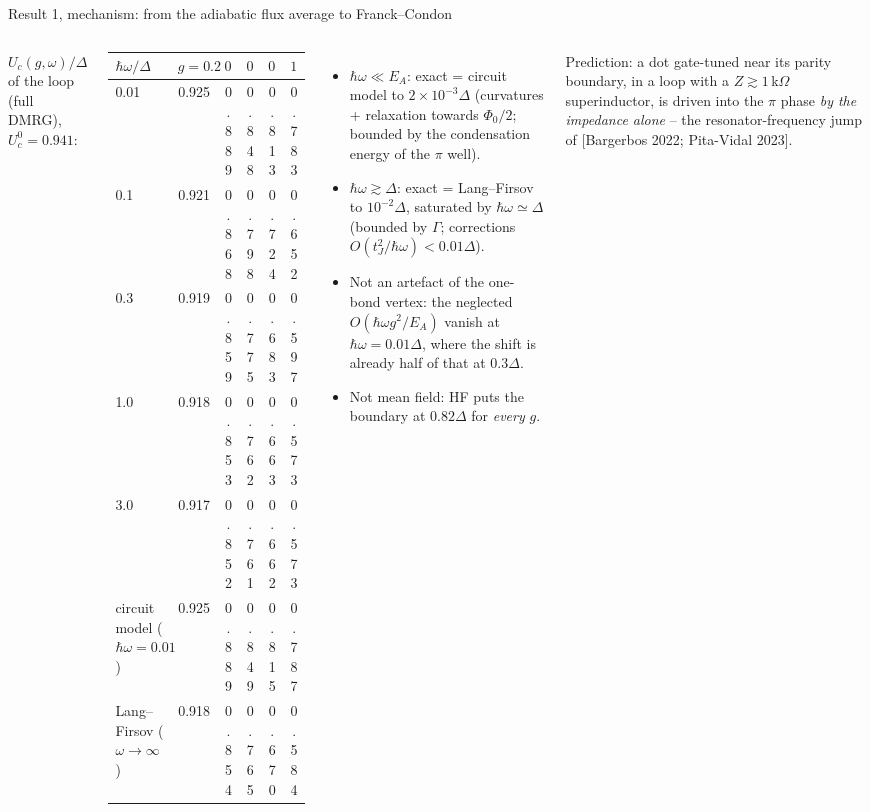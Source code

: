 \documentclass[aspectratio=169,9pt]{beamer}
\newcommand{\hw}{\hbar\omega}
\renewcommand{\cite}[1]{{\scriptsize\textcolor{ink!60}{[#1]}}}
\begin{document}
\begin{frame}{Result 1, mechanism: from the adiabatic flux average to Franck--Condon}
  \begin{columns}[T]
    \centering\small $U_c(g,\omega)/\Delta$ of the loop (full DMRG), $U_c^0=0.941$:\\[1mm]
    \scriptsize
    \begin{tabular}{@{}lccccc@{}}
      \toprule
      $\hw/\Delta$ & $g=0.2$ & $0.4$ & $0.6$ & $0.8$ & $1.0$\\ \midrule
      0.01 & 0.925 & 0.889 & 0.848 & 0.813 & 0.783\\
      0.1 & 0.921 & 0.868 & 0.798 & 0.724 & 0.652\\
      0.3 & 0.919 & 0.859 & 0.775 & 0.683 & 0.597\\
      1.0 & 0.918 & 0.853 & 0.762 & 0.663 & 0.573\\
      3.0 & 0.917 & 0.852 & 0.761 & 0.662 & 0.573\\ \midrule
      circuit model ($\hw=0.01$) & 0.925 & 0.889 & 0.849 & 0.815 & 0.787\\
      Lang--Firsov ($\omega\to\infty$) & 0.918 & 0.854 & 0.765 & 0.670 & 0.584\\ \bottomrule
    \end{tabular}
    \begin{itemize}\footnotesize
      \item $\hw\ll E_A$: exact = circuit model to $2\times10^{-3}\Delta$ (curvatures + relaxation towards $\Phi_0/2$;
            bounded by the condensation energy of the $\pi$ well).
      \item $\hw\gtrsim\Delta$: exact = Lang--Firsov to $10^{-2}\Delta$, saturated by $\hw\simeq\Delta$
            (bounded by $\Gamma$; corrections $O(t_J^2/\hw)<0.01\Delta$).
      \item Not an artefact of the one-bond vertex: the neglected $O(\hw g^2/E_A)$ vanish at $\hw=0.01\Delta$, where
            the shift is already half of that at $0.3\Delta$.
      \item Not mean field: HF puts the boundary at $0.82\Delta$ for \emph{every} $g$.
    \end{itemize}
    \begin{keybox}
      \footnotesize Prediction: a dot gate-tuned near its parity boundary, in a loop with a $Z\gtrsim1\,$k$\Omega$
      superinductor, is driven into the $\pi$ phase \emph{by the impedance alone} -- the resonator-frequency jump of
      \cite{Bargerbos 2022; Pita-Vidal 2023}.
    \end{keybox}
  \end{columns}
\end{frame}
\end{document}
